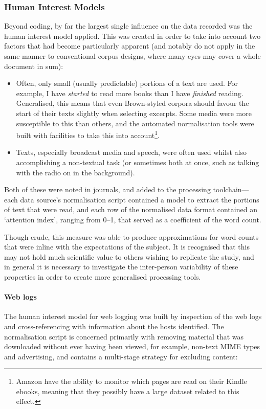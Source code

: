 \subsubsection{Human Interest Models}
Beyond coding, by far the largest single influence on the data recorded was the human interest model applied.  This was created in order to take into account two factors that had become particularly apparent (and notably do not apply in the same manner to conventional corpus designs, where many eyes may cover a whole document in sum):

\begin{itemize}
    \item Often, only small (usually predictable) portions of a text are used.  For example, I have \textsl{started} to read more books than I have \textsl{finished} reading.  Generalised, this means that even Brown-styled corpora should favour the start of their texts slightly when selecting excerpts.  Some media were more susceptible to this than others, and the automated normalisation tools were built with facilities to take this into account\footnote{Amazon have the ability to monitor which pages are read on their Kindle ebooks, meaning that they possibly have a large dataset related to this effect.}.
    \item Texts, especially broadcast media and speech, were often used whilst also accomplishing a non-textual task (or sometimes both at once, such as talking with the radio on in the background).
\end{itemize}

Both of these were noted in journals, and added to the processing toolchain---each data source's normalisation script contained a model to extract the portions of text that were read, and each row of the normalised data format contained an `attention index', ranging from 0--1, that served as a coefficient of the word count.

Though crude, this measure was able to produce approximations for word counts that were inline with the expectations of the subject.  It is recognised that this may not hold much scientific value to others wishing to replicate the study, and in general it is necessary to investigate the inter-person variability of these properties in order to create more generalised processing tools.


\paragraph{Web logs}
The human interest model for web logging was built by inspection of the web logs and cross-referencing with information about the hosts identified.  The normalisation script is concerned primarily with removing material that was downloaded without ever having been viewed, for example, non-text MIME types and advertising, and contains a multi-stage strategy for excluding content:

